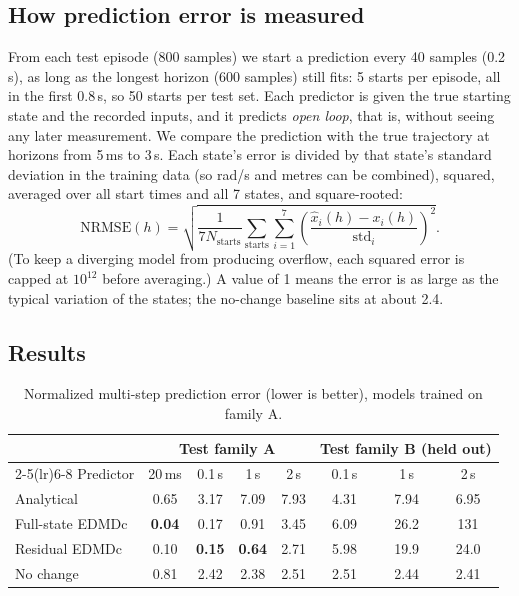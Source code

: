 \subsection{How prediction error is measured}
From each test episode (800 samples) we start a prediction every 40 samples (0.2\,s), as long as the longest horizon (600 samples) still fits: 5 starts per episode, all in the first 0.8\,s, so 50 starts per test set. Each predictor is given the true starting state and the recorded inputs, and it predicts \emph{open loop}, that is, without seeing any later measurement. We compare the prediction with the true trajectory at horizons from 5\,ms to 3\,s. Each state's error is divided by that state's standard deviation in the training data (so rad/s and metres can be combined), squared, averaged over all start times and all 7 states, and square-rooted:
\begin{equation}
  \text{NRMSE}(h) = \sqrt{\frac{1}{7N_{\text{starts}}}\sum_{\text{starts}}\sum_{i=1}^{7}\left(\frac{\hat x_i(h) - x_i(h)}{\operatorname{std}_i}\right)^2 }.
\end{equation}
(To keep a diverging model from producing overflow, each squared error is capped at $10^{12}$ before averaging.) A value of 1 means the error is as large as the typical variation of the states; the no-change baseline sits at about 2.4.

\subsection{Results}
\begin{table}[h]
\centering\small
\caption{Normalized multi-step prediction error (lower is better), models trained on family A.}\label{tab:pred}
\begin{tabular}{lccccccc}
\toprule
& \multicolumn{4}{c}{Test family A} & \multicolumn{3}{c}{Test family B (held out)} \\
\cmidrule(lr){2-5}\cmidrule(lr){6-8}
Predictor & 20\,ms & 0.1\,s & 1\,s & 2\,s & 0.1\,s & 1\,s & 2\,s \\
\midrule
Analytical & 0.65 & 3.17 & 7.09 & 7.93 & 4.31 & 7.94 & 6.95 \\
Full-state EDMDc & \textbf{0.04} & 0.17 & 0.91 & 3.45 & 6.09 & 26.2 & 131 \\
Residual EDMDc & 0.10 & \textbf{0.15} & \textbf{0.64} & 2.71 & 5.98 & 19.9 & 24.0 \\
No change & 0.81 & 2.42 & 2.38 & 2.51 & 2.51 & 2.44 & 2.41 \\
\bottomrule
\end{tabular}
\end{table}

